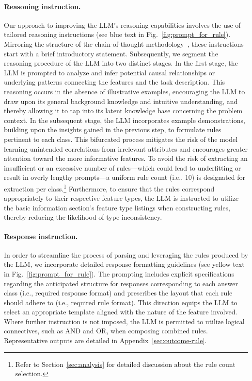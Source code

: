 \paragraph{Reasoning instruction.} Our approach to improving the LLM's reasoning capabilities involves the use of tailored reasoning instructions (see blue text in Fig.~\ref{fig:prompt_for_rule}). Mirroring the structure of the chain-of-thought methodology~\cite{wei2022chain}, these instructions start with a brief introductory statement. Subsequently, we segment the reasoning procedure of the LLM into two distinct stages. In the first stage, the LLM is prompted to analyze and infer potential causal relationships or underlying patterns connecting the features and the task description. This reasoning occurs in the absence of illustrative examples, encouraging the LLM to draw upon its general background knowledge and intuitive understanding, and thereby allowing it to tap into its latent knowledge base concerning the problem context. In the subsequent stage, the LLM incorporates example demonstrations, building upon the insights gained in the previous step, to formulate rules pertinent to each class. This bifurcated process mitigates the risk of the model learning unintended correlations from irrelevant attributes and encourages greater attention toward the more informative features. To avoid the risk of extracting an insufficient or an excessive number of rules—which could lead to underfitting or result in overly lengthy prompts—a uniform rule count (i.e., 10) is designated for extraction per class.\footnote{Refer to Section~\ref{sec:analysis} for detailed discussion about the rule count selection.} Furthermore, to ensure that the rules correspond appropriately to their respective feature types, the LLM is instructed to utilize the basic information section's feature type listings when constructing rules, thereby reducing the likelihood of type inconsistency.

\vspace*{-0.12in}
\paragraph{Response instruction.} In order to streamline the process of parsing and leveraging the rules produced by the LLM, we incorporate detailed response formatting guidelines (see yellow text in Fig.~\ref{fig:prompt_for_rule}). The prompting includes explicit specifications regarding the anticipated structure for responses corresponding to each answer class (i.e., required response format) and prescribes the layout that each rule should adhere to (i.e., required rule format). This direction equips the LLM to select an appropriate template aligned with the nature of the feature involved. Where further instruction is not imposed, the LLM is permitted to utilize logical connectives, such as AND and OR, when composing combined rules. Representative outputs are detailed in Appendix~\ref{sec:outcome-rule}.

